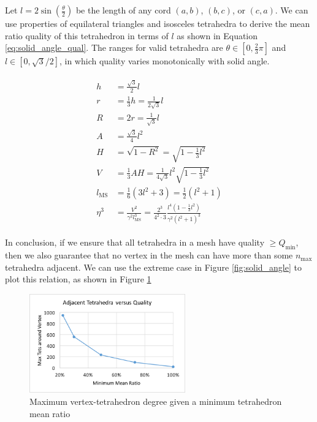 Let $l=2\sin\left(\frac{\theta}{2}\right)$ be the length of any cord $(a,b)$, $(b,c)$, or $(c,a)$.
We can use properties of equilateral triangles and isosceles
tetrahedra to derive the mean ratio quality of this tetrahedron
in terms of $l$ as shown in Equation \ref{eq:solid_angle_qual}.
The ranges for valid tetrahedra are $\theta\in[0,\frac23\pi]$ and $l\in[0,\sqrt{3}/2]$,
in which quality varies monotonically with solid angle.

\begin{gather} \label{eq:solid_angle_qual}
\begin{split}
h &= \tfrac{\sqrt{3}}{2}l \\
r &= \tfrac13 h = \tfrac{1}{2\sqrt{3}}l \\
R &= 2r = \tfrac{1}{\sqrt{3}}l \\
A &= \tfrac{\sqrt{3}}{4}l^2 \\
H &= \sqrt{1-R^2} = \sqrt{1-\tfrac13 l^2} \\
V &= \tfrac13 A H = \tfrac{1}{4\sqrt{3}} l^2\sqrt{1-\tfrac13 l^2} \\
l_{\text{MS}} &= \tfrac16(3l^2 + 3) = \tfrac12(l^2 + 1) \\
\eta^3 &= \frac{V^2}{\gamma^2 l_{\text{MS}}^3} =
\frac{2^3}{4^2\cdot 3}\frac{l^4(1-\tfrac13 l^2)}{\gamma^2 (l^2 + 1)^3}
\end{split}
\end{gather}

In conclusion, if we ensure that all tetrahedra in a mesh have
quality $\geq Q_{\text{min}}$, then we also guarantee that no
vertex in the mesh can have more than some $n_{\text{max}}$
tetrahedra adjacent.
We can use the extreme case in Figure \ref{fig:solid_angle}
to plot this relation, as shown in Figure \ref{fig:max_tet_deg}

\begin{figure}
\begin{center}
\includegraphics[width=0.6\textwidth]{max_tet_deg.png}
\caption{Maximum vertex-tetrahedron degree given a minimum tetrahedron mean ratio}
\label{fig:max_tet_deg}
\end{center}
\end{figure}

